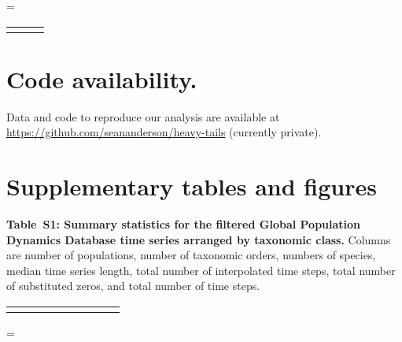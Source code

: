 \documentclass[12pt]{article}
\begin{document}
\LTcapwidth=\textwidth
\singlespacing
\begin{footnotesize}
\begin{longtable}{>{\RaggedRight}m{3.2cm}>{\RaggedRight}p{6.5cm}>{\RaggedRight}p{5.0cm}}
\toprule

\label{tab:phylopic}
\end{longtable}
\end{footnotesize}
\onehalfspacing

\section{Code availability.} Data and code to reproduce our analysis are available at \url{https://github.com/seananderson/heavy-tails} (currently private).


%


\section{Supplementary tables and figures}


\singlespacing

\textbf{Table~S1: Summary statistics for the filtered Global Population Dynamics Database time series arranged by taxonomic class.} Columns are number of populations, number of taxonomic orders, numbers of species, median time series length, total number of interpolated time steps, total number of substituted zeros, and total number of time steps.

\onehalfspacing

\smallskip
\begin{scriptsize}
\begin{tabular}{lrrrrrrrr}
\toprule

\label{tab:stats}
\end{tabular}
\end{scriptsize}

\clearpage

\LTcapwidth=\textwidth

\renewcommand{\thefigure}{S\arabic{figure}}
\renewcommand{\thetable}{S\arabic{table}}
\end{document}
